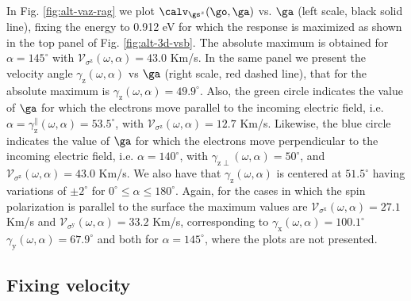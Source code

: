 \documentclass[prb,11pt,tightenlines,twocolumn,aps]{revtex4-1}
\begin{document}
In Fig. \ref{fig:alt-vaz-rag} we plot $\calv_{\gs^z}(\go,\ga)$ vs. $\ga$
(left scale, black solid line), fixing the energy to
0.912 eV for which the response is maximized as shown in the
top panel of Fig. \ref{fig:alt-3d-vsb}. The absolute maximum is
obtained for
$\alpha = 145^{\circ}$ with  
$\mathcal{V}_{\sigma^{\mathrm{z}}} (\omega,\alpha) = 43.0$ Km/s.
% 
In the same panel we present the velocity angle
$\gamma_{\mathrm{z}}(\omega,\alpha)$ vs $\ga$ (right scale, red dashed line),
that for the absolute maximum is $\gamma_{\mathrm{z}}(\omega,\alpha) =
49.9^{\circ}$.
% 
Also, the green circle indicates
the value of $\ga$ for which the 
electrons move parallel to the incoming electric field, 
i.e. $\alpha = \gamma_{\mathrm{z}}^\parallel(\omega,\alpha) =
53.5^{\circ}$, with 
$\mathcal{V}_{\sigma^{\mathrm{z}}}(\omega,\alpha) = 12.7$ Km/s. 
Likewise, the blue circle indicates
the value of $\ga$ for which the electrons move perpendicular to the
incoming electric field, i.e. 
$\alpha=140^{\circ}$, with
$\gamma_{\mathrm{z}\perp}(\omega,\alpha)=50^{\circ}$, and 
$\mathcal{V}_{\sigma^{\mathrm{z}}} (\omega,\alpha)=43.0$ Km/s.
% 
We also have that 
$\gamma_{\mathrm{z}}(\omega,\alpha)$ 
is centered at $51.5^{\circ}$ having
variations of $\pm 2^{\circ}$ for $0^{\circ} \leq
\alpha \leq 180^{\circ}$.
% 
Again, for the cases in which the spin polarization is parallel to the surface
the maximum values are
$\mathcal{V}_{\sigma^{\mathrm{x}}}(\omega,\alpha) = 27.1$ Km/s and
$\mathcal{V}_{\sigma^{\mathrm{y}}}(\omega,\alpha) = 33.2$ Km/s, corresponding to 
$\gamma_{\mathrm{x}}(\omega,\alpha) = 100.1^{\circ}$
$\gamma_{\mathrm{y}}(\omega,\alpha) = 67.9^{\circ}$
and both for $\alpha=145^{\circ}$, where
the plots are not presented. 






\subsection{Fixing velocity} %
\label{sec:res-fixvel}


\end{document}
